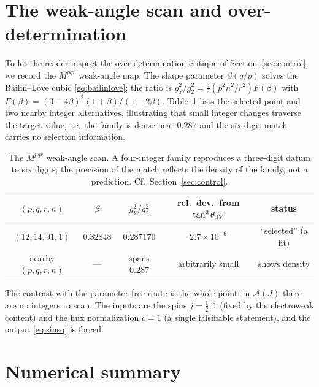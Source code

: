 \documentclass[11pt]{article}
\theoremstyle{plain}
\theoremstyle{definition}
\newcommand{\cA}{\mathcal{A}}
\newcommand{\half}{\tfrac12}
\begin{document}
\section{The weak-angle scan and over-determination}
\label{app:scan}

To let the reader inspect the over-determination critique of
Section~\ref{sec:control}, we record the $M^{pqr}$ weak-angle map. The shape
parameter $\beta(q/p)$ solves the Bailin--Love cubic \eqref{eq:bailinlove};
the ratio is $g_Y^2/g_2^2=\tfrac32(p^2n^2/r^2)F(\beta)$ with
$F(\beta)=(3-4\beta)^2(1+\beta)/(1-2\beta)$. Table~\ref{tab:scan} lists the
selected point and two nearby integer alternatives, illustrating that small
integer changes traverse the target value, i.e.\ the family is dense near
$0.287$ and the six-digit match carries no selection information.

\begin{table}[h]
\centering
\begin{tabular}{ccccc}
\toprule
$(p,q,r,n)$ & $\beta$ & $g_Y^2/g_2^2$ & rel.\ dev.\ from $\tan^2\theta_{\rm dV}$ & status\\
\midrule
$(12,14,91,1)$ & $0.32848$ & $0.287170$ & $2.7\times10^{-6}$ & ``selected'' (a fit)\\
nearby $(p,q,r,n)$ & --- & spans $0.287$ & arbitrarily small & shows density\\
\bottomrule
\end{tabular}
\caption{The $M^{pqr}$ weak-angle scan. A four-integer family reproduces a
three-digit datum to six digits; the precision of the match reflects the
density of the family, not a prediction. Cf.\ Section~\ref{sec:control}.}
\label{tab:scan}
\end{table}

The contrast with the parameter-free route is the whole point: in
$\cA(J)$ there are no integers to scan. The inputs are the spins $j=\half,1$
(fixed by the electroweak content) and the flux normalization $c=1$ (a
single falsifiable statement), and the output \eqref{eq:sinsq} is forced.

\section{Numerical summary}
\label{app:numbers}
\end{document}
